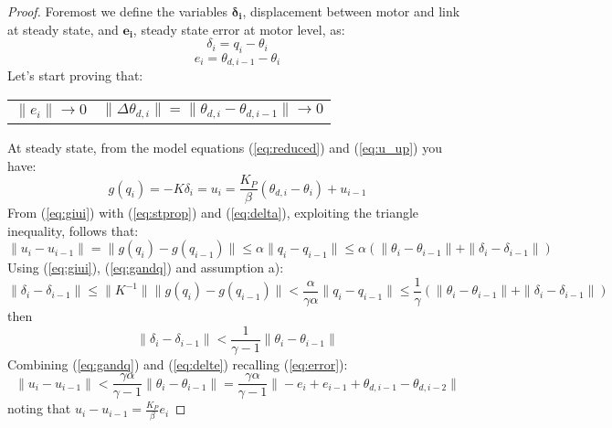\begin{proof}
Foremost we define the variables $\pmb{\delta_i}$, displacement between motor and link at steady state, and  $\pmb{e_i}$, steady state error at motor level, as:
\begin{equation} \label{eq:delta}
\delta_i = q_i - \theta_i 
\end{equation}
\begin{equation} \label{eq:error}
e_i = \theta_{d,i-1}-\theta_i
\end{equation}
Let's start proving that: \\
{\centering\compress
\begin{tabularx}{\linewidth}{>{\leqnomode}XX}
\begin{equation} \label{eq:etozero}
\|e_i\|\to 0
\end{equation}
& 
\begin{equation} \label{eq:deltatozero}
\|\Delta\theta_{d,i}\| = \|\theta_{d,i}-\theta_{d,i-1}\|\to 0
\end{equation}
\end{tabularx}}
At steady state, from the model equations (\ref{eq:reduced}) and (\ref{eq:u_up}) you have: \\
\begin{equation}\label{eq:giui}
    g(q_i) = -K\delta_i= u_i = \frac{K_P}{\beta}(\theta_{d,i}-\theta_i) + u_{i-1}  
\end{equation}
From (\ref{eq:giui}) with (\ref{eq:stprop}) and (\ref{eq:delta}), exploiting the triangle inequality, follows that:
\begin{equation}\label{eq:gandq}
\|u_i-u_{i-1}\| = \|g(q_i)-g(q_{i-1})\| \leq \alpha \|q_i-q_{i-1}\|
\leq\alpha(\|\theta_i-\theta_{i-1}\|+\|\delta_i-\delta_{i-1}\|)
\end{equation}
Using (\ref{eq:giui}), (\ref{eq:gandq}) and assumption a):
\[
    \| \delta_i - \delta_{i-1} \| \leq \|K^{-1}\| \|g(q_i)-g(q_{i-1})\|< \frac{\alpha}{\gamma \alpha}\| q_i - q_{i-1} \| \leq\frac{1}{\gamma}(\|\theta_i-\theta_{i-1}\|+\|\delta_i-\delta_{i-1}\|)
\]
then
\begin{equation}\label{eq:delte}
    \| \delta_i - \delta_{i-1} \| < \frac{1}{\gamma-1}\|\theta_i-\theta_{i-1}\|
\end{equation}
Combining (\ref{eq:gandq}) and (\ref{eq:delte}) recalling (\ref{eq:error}):
\[
 \|u_i-u_{i-1}\| < \frac{\gamma\alpha}{\gamma-1}\|\theta_i-\theta_{i-1}\|
 = \frac{\gamma\alpha}{\gamma-1}\|-e_i + e_{i-1} + \theta_{d,i-1}-\theta_{d,i-2}\|
\]
noting that \(u_i-u_{i-1} = \frac{K_P}{\beta} e_i \)


\end{proof}
